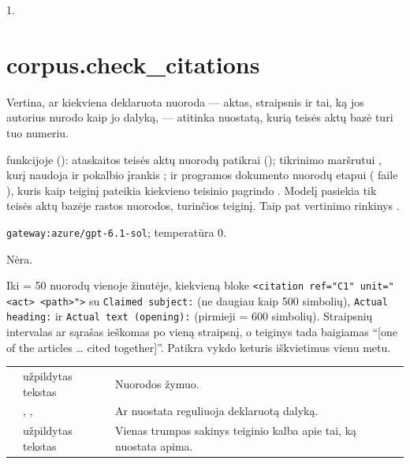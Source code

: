  1.


\section{corpus.check\_citations}\label{sec:aprompts:corpus-check_citations}

 Vertina, ar kiekviena deklaruota nuoroda --- aktas, straipsnis ir
tai, ką jos autorius nurodo kaip jo dalyką, --- atitinka nuostatą, kurią teisės aktų bazė turi
tuo numeriu.

  funkcijoje 
(): ataskaitos teisės aktų nuorodų patikrai ();
tikrinimo maršrutui , kurį naudoja ir pokalbio įrankis
; ir programos dokumento nuorodų etapui ( faile
), kuris kaip teiginį pateikia kiekvieno teisinio pagrindo .
Modelį pasiekia tik teisės aktų bazėje rastos nuorodos, turinčios teiginį. Taip pat vertinimo
rinkinys .

 \texttt{gateway:azure/gpt-6.1-sol}; temperatūra 0.

 Nėra.

 Iki  = 50 nuorodų vienoje žinutėje, kiekvieną
bloke \texttt{<citation ref="C1" unit="<act> <path>">} su \texttt{Claimed subject:} (ne daugiau
kaip 500 simbolių), \texttt{Actual heading:} ir \texttt{Actual text (opening):} (pirmieji
 = 600 simbolių). Straipsnių intervalas ar sąrašas ieškomas po vieną
straipsnį, o teiginys tada baigiamas \enquote{[one of the articles … cited together]}. Patikra
vykdo keturis iškvietimus vienu metu.

\par\nopagebreak
\begin{xltabular}{\textwidth}{@{}L{38mm}L{40mm}Y@{}}
\toprule
{} &  &  \\
\midrule
\endhead
\bottomrule
\endlastfoot
{} & užpildytas tekstas & Nuorodos žymuo. \\
 & , ,  & Ar nuostata reguliuoja deklaruotą dalyką. \\
 & užpildytas tekstas & Vienas trumpas sakinys teiginio kalba apie tai, ką nuostata apima. \\
\end{xltabular}

